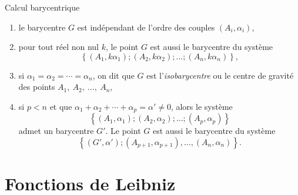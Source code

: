 \begin{chapter}{Calcul barycentrique}
\begin{prop}
            \begin{enumerate}
                  \item le barycentre $G$ est ind\'ependant de l'ordre des couples $(A_i , \alpha_i)$,
	                  \item pour tout r\'eel non nul $k$, le point $G$ est aussi le barycentre du syst\`eme 
	                        \[
	                          \left\lbrace (A_1,k\alpha_1) ; (A_2,k\alpha_2) ; \ldots ; (A_n,k\alpha_n) \right\rbrace,
	                        \]
                  \item {}
                        si $\alpha_1 = \alpha_2 = \cdots = \alpha_n$, on dit que $G$ est 
                        l'\emph{isobarycentre} ou le centre de gravit\'e des points 
                        $A_1,\ A_2,\ \ldots ,\ A_n$,
                  \item \label{prop: associativite}
                        si $p<n$ et que $\alpha_1 + \alpha_2 + \cdots + \alpha_p = \alpha' \neq 0$, alors 
	                        le syst\`eme 
	                        \[
	                          \left\lbrace (A_1,\alpha_1) ; (A_2,\alpha_2) ; \ldots ; (A_p,\alpha_p) \right\rbrace
	                        \]
                        admet un barycentre $G'$.
	                        Le point $G$ est aussi le barycentre du syst\`eme 
	                        \[
	                          \left\lbrace (G',\alpha') ; (A_{p+1},\alpha_{p+1}) , \ldots , (A_n,\alpha_n) \right\rbrace.
	                        \]
            \end{enumerate}
      \end{prop}
%
\section{Fonctions de Leibniz}
%

\end{chapter}
